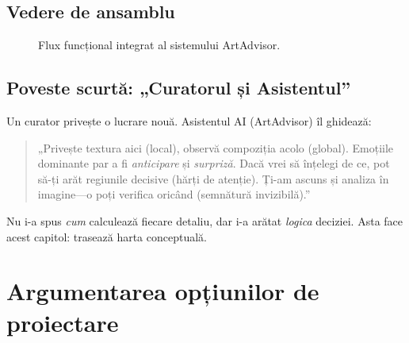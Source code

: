 \subsection{Vedere de ansamblu}
\begin{figure}[ht]
\centering
{}
\caption{Flux funcțional integrat al sistemului ArtAdvisor.}
\label{fig:flow}
\end{figure}

\subsection{Poveste scurtă: „Curatorul și Asistentul”}
Un curator privește o lucrare nouă. Asistentul AI (ArtAdvisor) îl ghidează:
\begin{quote}
„Privește textura aici (local), observă compoziția acolo (global). Emoțiile dominante par a fi \emph{anticipare} și \emph{surpriză}. Dacă vrei să înțelegi de ce, pot să-ți arăt regiunile decisive (hărți de atenție). Ți-am ascuns și analiza în imagine—o poți verifica oricând (semnătură invizibilă).”
\end{quote}
Nu i-a spus \emph{cum} calculează fiecare detaliu, dar i-a arătat \emph{logica} deciziei. Asta face acest capitol: trasează harta conceptuală.

\section{Argumentarea opțiunilor de proiectare}
\label{sec:argumente}

